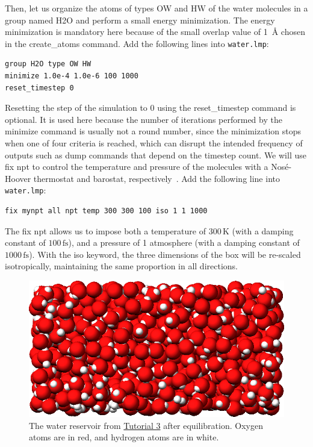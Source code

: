 \documentclass[9pt,tutorial]{livecoms}
\newcommand{\lmpcmd}[1]{\hspace{0pt}\colorbox{listing}{\textcolor{command}{\small{#1}}}\hspace{0pt}} %
\newcommand{\flecmd}[1]{\textcolor{command}{\texttt{#1}}} %
\begin{document}
Then, let us organize the atoms of types OW and HW of the water
molecules in a group named \lmpcmd{H2O} and perform a small energy
minimization.  The energy minimization is mandatory here because of the
small \lmpcmd{overlap} value of 1~Å chosen in the \lmpcmd{create\_atoms}
command.  Add the following lines into \flecmd{water.lmp}:
\begin{lstlisting}
group H2O type OW HW
minimize 1.0e-4 1.0e-6 100 1000
reset_timestep 0
\end{lstlisting}
Resetting the step of the simulation to 0 using the
\lmpcmd{reset\_timestep} command is optional.
{\color{blue}It is used here because the number of iterations performed by the \lmpcmd{minimize}
command is usually not a round number, since the minimization stops when one of
four criteria is reached, which can disrupt the intended frequency
of outputs such as \lmpcmd{dump} commands that depend on the timestep count.}
We will use \lmpcmd{fix npt} to control the temperature
and pressure of the molecules with a Nosé-Hoover thermostat and barostat,
respectively~\cite{nose1984unified, hoover1985canonical, martyna1994constant}.
Add the following line into \flecmd{water.lmp}:
\begin{lstlisting}
fix mynpt all npt temp 300 300 100 iso 1 1 1000
\end{lstlisting}
The \lmpcmd{fix npt} allows us to impose both a temperature of $300\,\text{K}$
(with a damping constant of $100\,\text{fs}$), and a pressure of 1 atmosphere
(with a damping constant of $1000\,\text{fs}$).  With the \lmpcmd{iso} keyword,
the three dimensions of the box will be re-scaled {\color{blue}isotropically,
maintaining the same proportion in all directions.}

\begin{figure}
\centering
\includegraphics[width=\linewidth]{PEG-water}
\caption{The water reservoir from \hyperref[all-atom-label]{Tutorial 3}
after equilibration.  Oxygen atoms are in red, and hydrogen atoms are in white.}
\label{fig:PEG-water}
\end{figure}
\end{document}
